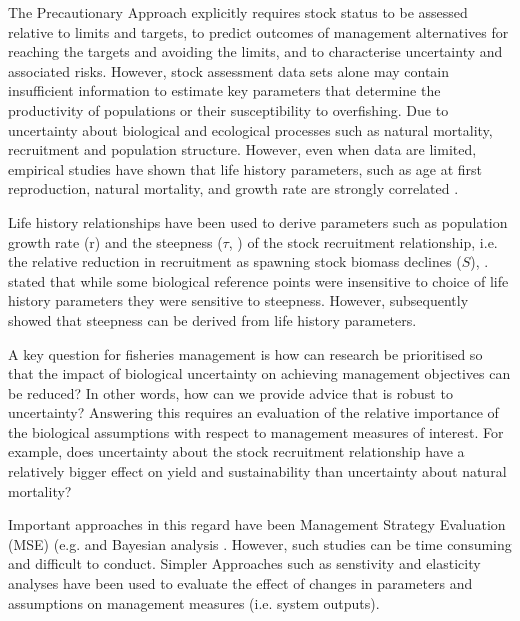 \documentclass[preprint,authoryear,12pt]{elsarticle}
\begin{document}
The Precautionary Approach explicitly requires stock status to be assessed 
relative to limits and targets, to predict outcomes of management alternatives for reaching the targets 
and avoiding the limits, and to characterise uncertainty and associated risks. 
However, stock assessment data sets alone may contain insufficient information to estimate key 
parameters that determine the productivity of populations or their susceptibility to overfishing. 
Due to uncertainty about biological and ecological processes such as natural mortality, 
recruitment and population structure. However, even when data are limited, empirical studies have
shown that life history parameters, such as age at first reproduction, natural mortality, and 
growth rate are strongly correlated \citep{roff1984evolution, andersen2006asymptotic, pope2006modelling, 
gislason2008coexistence}. 

Life history relationships have been used to derive parameters such as population growth 
rate (r) and the steepness ($\tau$, \cite{francis1992use}) of the stock recruitment relationship, 
i.e. the relative reduction in recruitment as  spawning stock biomass declines ($S$), 
\citep{mcallister2001using, simon2012effects}. \cite{williams2003implications} stated that while 
some biological reference points were insensitive to choice of life history  parameters they were 
sensitive to steepness. However, subsequently \citep{mangel2010reproductive, simon2012effects} showed that 
steepness can be derived from life history parameters.

A key question for fisheries management is how can research be prioritised
so that the impact of biological uncertainty on achieving management objectives
can be reduced? In other words, how can we provide advice that is robust to uncertainty?
Answering this requires an evaluation of the relative importance of the biological assumptions 
with respect to management measures of interest. For example, does uncertainty about the stock recruitment
relationship have a relatively bigger effect on yield and sustainability than uncertainty
about natural mortality? 

Important approaches in this regard have been Management Strategy Evaluation (MSE) (e.g.  \citep{cooke1999improvement, 
mcallister2001using, kell2007flr, punt2007developing}  and Bayesian analysis
\citep{haapasaari2010formalizing,uusitalo2007advantages, levontin2011integration}. However, such 
studies can be time consuming and difficult to conduct.
Simpler Approaches such as senstivity and elasticity analyses have been used to evaluate
the effect of changes in parameters and assumptions on management measures (i.e. system outputs). 
\end{document}

